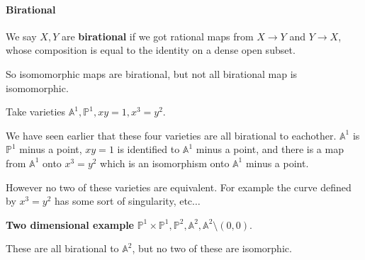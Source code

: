 \paragraph*{Birational}

\begin{definition}
    We say $X,Y$ are \textbf{birational} if we got rational maps from $X\rightarrow Y$ and $Y\rightarrow X$, whose composition is equal to the identity on a dense open subset.
\end{definition}
So isomomorphic maps are birational, but not all birational map is isomomorphic.

\begin{example}
    Take varieties $\mathbb{A}^1,\mathbb{P}^1, xy= 1, x^3=y^2$.

    We have seen earlier that these four varieties are all birational to eachother. $\mathbb{A}^1$ is $\mathbb{P}^1$ minus a point, $xy=1$ is identified to $\mathbb{A}^1$ minus a point, and there is a map from $\mathbb{A}^1$ onto $x^3=y^2$ which is an isomorphism onto $\mathbb{A}^1$ minus a point.

    However no two of these varieties are equivalent. For example the curve defined by $x^3=y^2$ has some sort of singularity, etc$\ldots$
\end{example}

\begin{example}\textbf{Two dimensional example}
    $\mathbb{P}^1\times \mathbb{P}^1, \mathbb{P}^2,\mathbb{A}^2,\mathbb{A}^2\setminus (0,0)$.

    These are all birational to $\mathbb{A}^2$, but no two of these are isomorphic.
\end{example}

